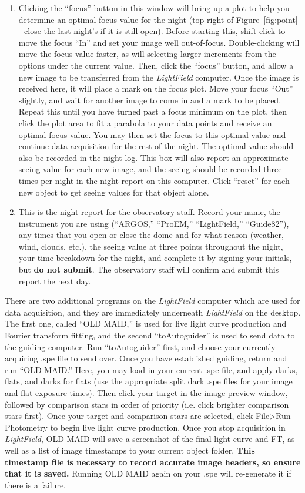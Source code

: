 \documentclass[12pt]{article}
\begin{document}
\begin{enumerate}
   \item Clicking the ``focus'' button in this window will bring up a plot to help you determine an optimal focus value for the night (top-right of Figure~\ref{fig:point} - close the last night's if it is still open). Before starting this, shift-click to move the focus ``In'' and set your image well out-of-focus. Double-clicking will move the focus value faster, as will selecting larger increments from the options under the current value. Then, click the ``focus'' button, and allow a new image to be transferred from the \textit{LightField} computer. Once the image is received here, it will place a mark on the focus plot. Move your focus ``Out'' slightly, and wait for another image to come in and a mark to be placed. Repeat this until you have turned past a focus minimum on the plot, then click the plot area to fit a parabola to your data points and receive an optimal focus value. You may then set the focus to this optimal value and continue data acquisition for the rest of the night. The optimal value should also be recorded in the night log. This box will also report an approximate seeing value for each new image, and the seeing should be recorded three times per night in the night report on this computer. Click ``reset'' for each new object to get seeing values for that object alone.
   \item This is the night report for the observatory staff. Record your name, the instrument you are using (``ARGOS,'' ``ProEM,'' ``LightField,'' ``Guide82''), any times that you open or close the dome and for what reason (weather, wind, clouds, etc.), the seeing value at three points throughout the night, your time breakdown for the night, and complete it by signing your initials, but \textbf{do not submit}. The observatory staff will confirm and submit this report the next day.
\end{enumerate}

There are two additional programs on the \textit{LightField} computer which are used for data acquisition, and they are immediately underneath \textit{LightField} on the desktop. The first one, called ``OLD MAID,'' is used for live light curve production and Fourier transform fitting, and the second ``toAutoguider'' is used to send data to the guiding computer. Run ``toAutoguider'' first, and choose your currently-acquiring .spe file to send over. Once you have established guiding, return and run ``OLD MAID.'' Here, you may load in your current .spe file, and apply darks, flats, and darks for flats (use the appropriate split dark .spe files for your image and flat exposure times). Then click your target in the image preview window, followed by comparison stars in order of priority (i.e. click brighter comparison stars first). Once your target and comparison stars are selected, click File\textgreater Run Photometry to begin live light curve production. Once you stop acquisition in \textit{LightField}, OLD MAID will save a screenshot of the final light curve and FT, as well as a list of image timestamps to your current object folder. \textbf{This timestamp file is necessary to record accurate image headers, so ensure that it is saved.} Running OLD MAID again on your .spe will re-generate it if there is a failure.
\end{document}
